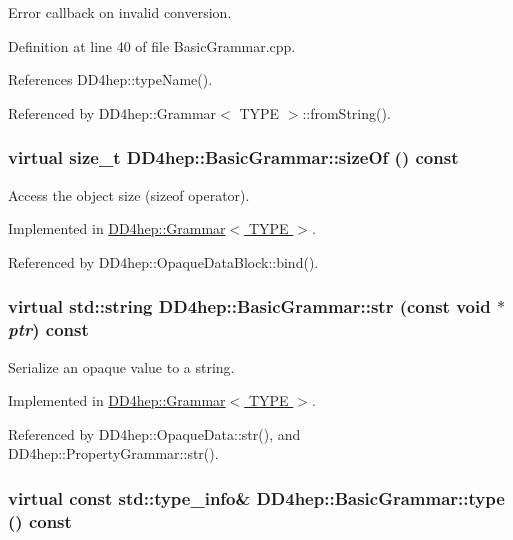Error callback on invalid conversion. 

Definition at line 40 of file BasicGrammar.cpp.

References DD4hep::typeName().

Referenced by DD4hep::Grammar$<$ TYPE $>$::fromString().\hypertarget{class_d_d4hep_1_1_basic_grammar_a5e2ae03f6371357d3da7e082bbeabb0d}{
\subsubsection[{sizeOf}]{\setlength{\rightskip}{0pt plus 5cm}virtual size\_\-t DD4hep::BasicGrammar::sizeOf () const}}
\label{class_d_d4hep_1_1_basic_grammar_a5e2ae03f6371357d3da7e082bbeabb0d}


Access the object size (sizeof operator). 

Implemented in \hyperlink{class_d_d4hep_1_1_grammar_ab6c57bd9efbcd2964fa78864ebcf26c5}{DD4hep::Grammar$<$ TYPE $>$}.

Referenced by DD4hep::OpaqueDataBlock::bind().\hypertarget{class_d_d4hep_1_1_basic_grammar_a92fb01e1333540f417ef8151e774fd72}{
\subsubsection[{str}]{\setlength{\rightskip}{0pt plus 5cm}virtual std::string DD4hep::BasicGrammar::str (const void $\ast$ {\em ptr}) const}}
\label{class_d_d4hep_1_1_basic_grammar_a92fb01e1333540f417ef8151e774fd72}


Serialize an opaque value to a string. 

Implemented in \hyperlink{class_d_d4hep_1_1_grammar_a314d7a19d5f14066677c5fe3f2338291}{DD4hep::Grammar$<$ TYPE $>$}.

Referenced by DD4hep::OpaqueData::str(), and DD4hep::PropertyGrammar::str().\hypertarget{class_d_d4hep_1_1_basic_grammar_a697d38c53f67a86bb182350dad284402}{
\subsubsection[{type}]{\setlength{\rightskip}{0pt plus 5cm}virtual const std::type\_\-info\& DD4hep::BasicGrammar::type () const}}
\label{class_d_d4hep_1_1_basic_grammar_a697d38c53f67a86bb182350dad284402}


